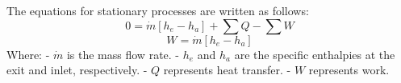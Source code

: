 The equations for stationary processes are written as follows:  
\[
0 = \dot{m} \left[ h_e - h_a \right] + \sum Q - \sum W
\]
\[
W = \dot{m} \left[ h_e - h_a \right]
\]  
Where:  
- \( \dot{m} \) is the mass flow rate.  
- \( h_e \) and \( h_a \) are the specific enthalpies at the exit and inlet, respectively.  
- \( Q \) represents heat transfer.  
- \( W \) represents work.